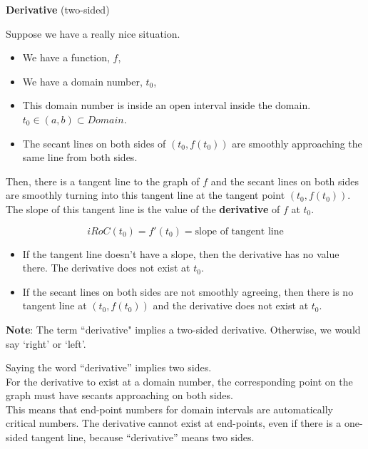 \documentclass{ximera}
\begin{document}
\begin{definition} \textbf{\textcolor{green!50!black}{Derivative}}  (two-sided)


Suppose we have a really nice situation.


\begin{itemize}
\item We have a function, $f$, 
\item We have a domain number, $t_0$, 
\item This domain number is inside an open interval inside the domain.  $t_0 \in (a, b) \subset Domain$. 
\item The secant lines on both sides of $(t_0, f(t_0))$ are smoothly approaching the same line from both sides.
\end{itemize}

Then, there is a tangent line to the graph of $f$ and the secant lines on both sides are smoothly turning into this tangent line at the tangent point $(t_0, f(t_0))$. \\

The slope of this tangent line is the value of the \textbf{derivative} of $f$ at $t_0$.

\[
iRoC(t_0) =f'(t_0) = \text{slope of tangent line}
\]


\begin{itemize}
  \item If the tangent line doesn't have a slope, then the derivative has no value there. The derivative does not exist at $t_0$.

  \item If the secant lines on both sides are not smoothly agreeing, then there is no tangent line at $(t_0, f(t_0))$ and the derivative does not exist at $t_0$.   
\end{itemize}

\end{definition}

\textbf{Note}: The term ``derivative" implies a two-sided derivative.  Otherwise, we would say `right' or `left'. \\




\begin{warning}

Saying the word ``derivative'' implies two sides. \\

For the derivative to exist at a domain number, the corresponding point on the graph must have secants approaching on both sides. \\


This means that end-point numbers for domain intervals are automatically critical numbers.  The derivative cannot exist at end-points, even if there is a one-sided tangent line, because ``derivative'' means two sides. \\

\end{warning}
\end{document}
